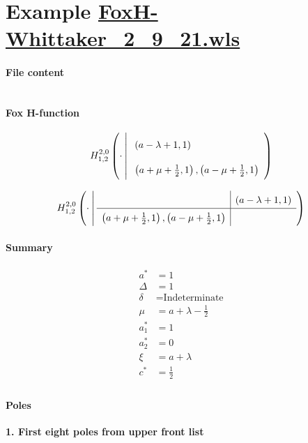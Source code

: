 \documentclass[11pt]{article}
\begin{document}
\section{Example \url{FoxH-Whittaker_2_9_21.wls}}

\paragraph{File content}

\inputminted{text}{FoxH-Whittaker_2_9_21.wls}

\paragraph{Fox H-function}

\begin{align*}
  \FoxH
    {2,0}
    {1,2}
    {\cdot}
    {\left(a-\lambda +1, 1\right)}
    {\left(a+\mu +\frac{1}{2}, 1\right), \left(a-\mu +\frac{1}{2}, 1\right)}
\end{align*}

\begin{align*}
  \FoxHext
    {2,0}
    {1,2}
    {\cdot}
    {}
    {\left(a-\lambda +1, 1\right)}
    {\left(a+\mu +\frac{1}{2}, 1\right), \left(a-\mu +\frac{1}{2}, 1\right)}
    {}
\end{align*}

\paragraph{Summary}

\begin{align*}
  a^*    & = 1 \\
  \Delta & = 1 \\
  \delta & = \text{Indeterminate} \\
  \mu    & = a+\lambda -\frac{1}{2} \\
  a_1^*  & = 1 \\
  a_2^*  & = 0 \\
  \xi    & = a+\lambda \\
  c^*    & = \frac{1}{2} \\
\end{align*}

\paragraph{Poles}

\noindent\textbf{1. First eight poles from upper front list}
\end{document}
